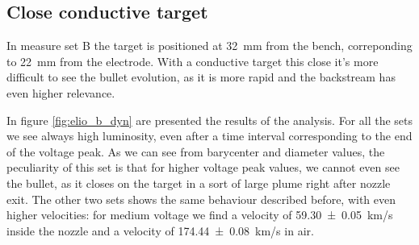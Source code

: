 \subsection{Close conductive target}
In measure set B the target is positioned at \SI{32}{\milli\meter} from the bench, correponding to \SI{22}{\milli\meter} from the electrode.
With a conductive target this close it's more difficult to see the bullet evolution, as it is more rapid and the backstream has even higher relevance.

In figure \ref{fig:elio_b_dyn} are presented the results of the analysis. For all the sets we see always high luminosity, even after a time interval corresponding to the end of the voltage peak. As we can see from barycenter and diameter values, the peculiarity of this set is that for higher voltage peak values, we cannot even see the bullet, as it closes on the target in a sort of large plume right after nozzle exit. The other two sets shows the same behaviour described before, with even higher velocities: for medium voltage we find a velocity of \SI{59.30(5)}{\kilo\meter/\second} inside the nozzle and a velocity of \SI{174.44(8)}{\kilo\meter/\second} in air.
